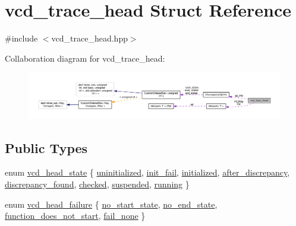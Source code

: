 \hypertarget{structvcd__trace__head}{}\section{vcd\+\_\+trace\+\_\+head Struct Reference}
\label{structvcd__trace__head}


{\ttfamily \#include $<$vcd\+\_\+trace\+\_\+head.\+hpp$>$}



Collaboration diagram for vcd\+\_\+trace\+\_\+head\+:
\nopagebreak
\begin{figure}[H]
\begin{center}
\leavevmode
\includegraphics[width=350pt]{d6/d74/structvcd__trace__head__coll__graph}
\end{center}
\end{figure}
\subsection*{Public Types}
\begin{DoxyCompactItemize}
\item 
enum \hyperlink{structvcd__trace__head_ae433a47ff04aedfa841835d29f75207e}{vcd\+\_\+head\+\_\+state} \{ \newline
\hyperlink{structvcd__trace__head_ae433a47ff04aedfa841835d29f75207ea7c35876c0fc95989b9005d8d8f696afc}{uninitialized}, 
\hyperlink{structvcd__trace__head_ae433a47ff04aedfa841835d29f75207ea8dea7a0170e7e14a4d680cedb1c6ac95}{init\+\_\+fail}, 
\hyperlink{structvcd__trace__head_ae433a47ff04aedfa841835d29f75207ea083828820ffec0c8850314820209a876}{initialized}, 
\hyperlink{structvcd__trace__head_ae433a47ff04aedfa841835d29f75207ead20e078db22bd6a9124862b9dc75c244}{after\+\_\+discrepancy}, 
\newline
\hyperlink{structvcd__trace__head_ae433a47ff04aedfa841835d29f75207eaf484335545aa8e9fcd28192629aa598d}{discrepancy\+\_\+found}, 
\hyperlink{structvcd__trace__head_ae433a47ff04aedfa841835d29f75207ea72f1cc7f45169f2c360f2d8e532438b9}{checked}, 
\hyperlink{structvcd__trace__head_ae433a47ff04aedfa841835d29f75207eaa953c0f1429991b4f88799cea15830ea}{suspended}, 
\hyperlink{structvcd__trace__head_ae433a47ff04aedfa841835d29f75207ea75af84a41d125e5982af5797025c6946}{running}
 \}
\item 
enum \hyperlink{structvcd__trace__head_ad0e9ddff3ce422e4273ae6ccbb2a88f8}{vcd\+\_\+head\+\_\+failure} \{ \hyperlink{structvcd__trace__head_ad0e9ddff3ce422e4273ae6ccbb2a88f8a98d07172fabb08d77bd9b80ef4dd4435}{no\+\_\+start\+\_\+state}, 
\hyperlink{structvcd__trace__head_ad0e9ddff3ce422e4273ae6ccbb2a88f8abe0399b140fe73d68cb4bbae3d33c764}{no\+\_\+end\+\_\+state}, 
\hyperlink{structvcd__trace__head_ad0e9ddff3ce422e4273ae6ccbb2a88f8aa15e5073342d97da42014429f38816c7}{function\+\_\+does\+\_\+not\+\_\+start}, 
\hyperlink{structvcd__trace__head_ad0e9ddff3ce422e4273ae6ccbb2a88f8a512cc13d0c62c33e8b97c876d5747aa6}{fail\+\_\+none}
 \}
\end{DoxyCompactItemize}
